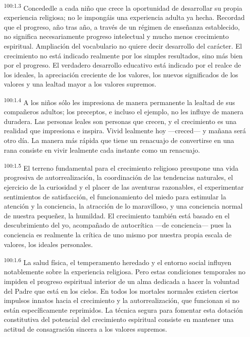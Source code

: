 \documentclass[twoside, 11pt]{book}
\begin{document}
\par
\textsuperscript{100:1.3} Concededle a cada niño que crece la oportunidad de desarrollar su propia experiencia religiosa; no le impongáis una experiencia adulta ya hecha. Recordad que el progreso, año tras año, a través de un régimen de enseñanza establecido, no significa necesariamente progreso intelectual y mucho menos crecimiento espiritual. Ampliación del vocabulario no quiere decir desarrollo del carácter. El crecimiento no está indicado realmente por los simples resultados, sino más bien por el progreso. El verdadero desarrollo educativo está indicado por el realce de los ideales, la apreciación creciente de los valores, los nuevos significados de los valores y una lealtad mayor a los valores supremos.

\par
\textsuperscript{100:1.4} A los niños sólo les impresiona de manera permanente la lealtad de sus compañeros adultos; los preceptos, e incluso el ejemplo, no les influye de manera duradera. Las personas leales son personas que crecen, y el crecimiento es una realidad que impresiona e inspira. Vivid lealmente hoy ---creced--- y mañana será otro día. La manera más rápida que tiene un renacuajo de convertirse en una rana consiste en vivir lealmente cada instante como un renacuajo.

\par
\textsuperscript{100:1.5} El terreno fundamental para el crecimiento religioso presupone una vida progresiva de autorrealización, la coordinación de las tendencias naturales, el ejercicio de la curiosidad y el placer de las aventuras razonables, el experimentar sentimientos de satisfacción, el funcionamiento del miedo para estimular la atención y la conciencia, la atracción de lo maravilloso, y una conciencia normal de nuestra pequeñez, la humildad. El crecimiento también está basado en el descubrimiento del yo, acompañado de autocrítica ---de conciencia--- pues la conciencia es realmente la crítica de uno mismo por nuestra propia escala de valores, los ideales personales.

\par
\textsuperscript{100:1.6} La salud física, el temperamento heredado y el entorno social influyen notablemente sobre la experiencia religiosa. Pero estas condiciones temporales no impiden el progreso espiritual interior de un alma dedicada a hacer la voluntad del Padre que está en los cielos. En todos los mortales normales existen ciertos impulsos innatos hacia el crecimiento y la autorrealización, que funcionan si no están específicamente reprimidos. La técnica segura para fomentar esta dotación constitutiva del potencial del crecimiento espiritual consiste en mantener una actitud de consagración sincera a los valores supremos.
\end{document}
